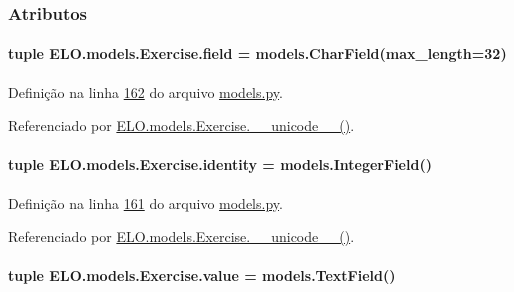 \subsubsection{Atributos}
\hypertarget{classELO_1_1models_1_1Exercise_a4567f8aa62747a0eabb1c89ab18ec1ce}{
\paragraph[{field}]{\setlength{\rightskip}{0pt plus 5cm}tuple E\-L\-O.\-models.\-Exercise.\-field = models.\-Char\-Field(max\-\_\-length=32)\hspace{0.3cm}{\ttfamily [static]}}}\label{classELO_1_1models_1_1Exercise_a4567f8aa62747a0eabb1c89ab18ec1ce}


Definição na linha \hyperlink{ELO_2models_8py_source_l00162}{162} do arquivo \hyperlink{ELO_2models_8py_source}{models.\-py}.



Referenciado por \hyperlink{classELO_1_1models_1_1Exercise_af3e991e5610cec815a2c3260ec6aae0b}{E\-L\-O.\-models.\-Exercise.\-\_\-\-\_\-unicode\-\_\-\-\_\-()}.

\hypertarget{classELO_1_1models_1_1Exercise_a0b63268e129a279de260ad21060a1b55}{
\paragraph[{identity}]{\setlength{\rightskip}{0pt plus 5cm}tuple E\-L\-O.\-models.\-Exercise.\-identity = models.\-Integer\-Field()\hspace{0.3cm}{\ttfamily [static]}}}\label{classELO_1_1models_1_1Exercise_a0b63268e129a279de260ad21060a1b55}


Definição na linha \hyperlink{ELO_2models_8py_source_l00161}{161} do arquivo \hyperlink{ELO_2models_8py_source}{models.\-py}.



Referenciado por \hyperlink{classELO_1_1models_1_1Exercise_af3e991e5610cec815a2c3260ec6aae0b}{E\-L\-O.\-models.\-Exercise.\-\_\-\-\_\-unicode\-\_\-\-\_\-()}.

\hypertarget{classELO_1_1models_1_1Exercise_ae4d0d7ecfe0004385c031cbba76f3b4d}{
\paragraph[{value}]{\setlength{\rightskip}{0pt plus 5cm}tuple E\-L\-O.\-models.\-Exercise.\-value = models.\-Text\-Field()\hspace{0.3cm}{\ttfamily [static]}}}\label{classELO_1_1models_1_1Exercise_ae4d0d7ecfe0004385c031cbba76f3b4d}


